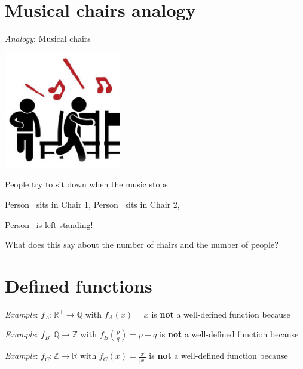\documentclass[12pt, oneside]{article}
\begin{document}
\section*{Musical chairs analogy}


{\it Analogy}: Musical chairs

\begin{multicols}{2}
\includegraphics[width=2in]{../../resources/images/musicalChairs.png}
\columnbreak

People try to sit down when the music stops

Person\sun~ sits in Chair 1,
Person\smiley~ sits in Chair 2,

Person\frownie~  is left standing!
\end{multicols}
What does this say about the number of chairs and the number of people? \vfill
\section*{Defined functions}




{\it Example}: $f_A: \mathbb{R}^+ \to \mathbb{Q}$ with $f_A(x) = x$ is {\bf not} a well-defined function because

\vfill


{\it Example}: $f_B: \mathbb{Q} \to \mathbb{Z}$ with $f_B\left(\frac{p}{q}\right) = p+q$ is {\bf not} a well-defined function because

\vfill


{\it Example}: $f_C: \mathbb{Z} \to \mathbb{R}$ with $f_C(x) = \frac{x}{|x|}$ is {\bf not} a well-defined function because \vfill
\end{document}
